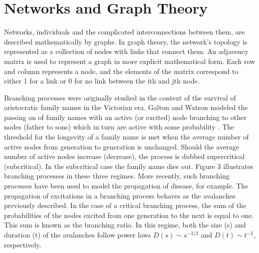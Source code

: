 \documentclass[12pt]{article}
\begin{document}
\section*{Networks and Graph Theory}

Networks, individuals and the complicated interconnections between them, are described mathematically by graphs. In graph theory, the network's topology is represented as a collection of nodes with links that connect them. An adjacency matrix is used to represent a graph in more explicit mathematical form. Each row and column represents a node, and the elements of the matrix correspond to either 1 for a link or 0 for no link between the ith and jth node.

Branching processes were originally studied in the context of the survival of aristocratic family names in the Victorian era. Galton and Watson modeled the passing on of family names with an active (or excited) node branching to other nodes (father to sons) which in turn are active with some probability \cite{Watson2014}. The threshold for the longevity of a family name is met when the average number of active nodes from generation to generation is unchanged. Should the average number of active nodes increase (decrease), the process is dubbed supercritical (subcritical). In the subcritical case the family name dies out. Figure 3 illustrates branching processes in these three regimes. More recently, such branching processes have been used to model the propagation of disease, for example. The propagation of excitations in a branching process behaves as the avalanches previously described. In the case of a critical branching process, the sum of the probabilities of the nodes excited from one generation to the next is equal to one. This sum is known as the branching ratio. In this regime, both the size (s) and duration (t) of the avalanches follow power laws $ D(s) \sim s^{-3/2} $ and $ D(t) \sim t^{-2} $, respectively. \cite{Larremore2014}
\end{document}
